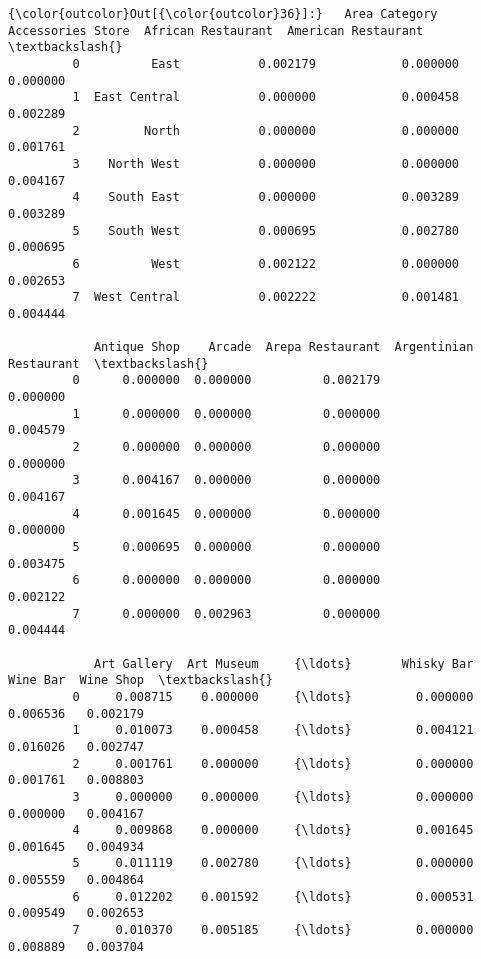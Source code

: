 \documentclass[11pt]{article}
\begin{document}
\begin{Verbatim}[commandchars=\\\{\}]
{\color{outcolor}Out[{\color{outcolor}36}]:}   Area Category  Accessories Store  African Restaurant  American Restaurant  \textbackslash{}
         0          East           0.002179            0.000000             0.000000   
         1  East Central           0.000000            0.000458             0.002289   
         2         North           0.000000            0.000000             0.001761   
         3    North West           0.000000            0.000000             0.004167   
         4    South East           0.000000            0.003289             0.003289   
         5    South West           0.000695            0.002780             0.000695   
         6          West           0.002122            0.000000             0.002653   
         7  West Central           0.002222            0.001481             0.004444   
         
            Antique Shop    Arcade  Arepa Restaurant  Argentinian Restaurant  \textbackslash{}
         0      0.000000  0.000000          0.002179                0.000000   
         1      0.000000  0.000000          0.000000                0.004579   
         2      0.000000  0.000000          0.000000                0.000000   
         3      0.004167  0.000000          0.000000                0.004167   
         4      0.001645  0.000000          0.000000                0.000000   
         5      0.000695  0.000000          0.000000                0.003475   
         6      0.000000  0.000000          0.000000                0.002122   
         7      0.000000  0.002963          0.000000                0.004444   
         
            Art Gallery  Art Museum     {\ldots}       Whisky Bar  Wine Bar  Wine Shop  \textbackslash{}
         0     0.008715    0.000000     {\ldots}         0.000000  0.006536   0.002179   
         1     0.010073    0.000458     {\ldots}         0.004121  0.016026   0.002747   
         2     0.001761    0.000000     {\ldots}         0.000000  0.001761   0.008803   
         3     0.000000    0.000000     {\ldots}         0.000000  0.000000   0.004167   
         4     0.009868    0.000000     {\ldots}         0.001645  0.001645   0.004934   
         5     0.011119    0.002780     {\ldots}         0.000000  0.005559   0.004864   
         6     0.012202    0.001592     {\ldots}         0.000531  0.009549   0.002653   
         7     0.010370    0.005185     {\ldots}         0.000000  0.008889   0.003704   
         

\end{Verbatim}
\end{document}
